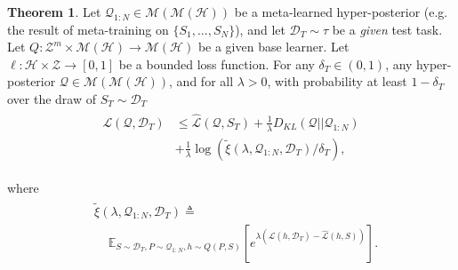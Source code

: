 \documentclass{article} %
\theoremstyle{definition}
\newtheorem{theorem}{Theorem}[section]
\newcommand{\Expect}[2]{\mathbb{E}_{#1}\left [#2 \right ]}
\begin{document}
\begin{theorem} 
	Let $\mathcal{Q}_{1:N}\in \mathcal{M}(\mathcal{M}(\mathcal{H}))$ be a meta-learned hyper-posterior (e.g. the result of meta-training on $\{S_1,...,S_N\}$), and let $\mathcal{D}_T\sim \tau$ be a \emph{given} test task. Let $Q: \mathcal{Z}^m\times\mathcal{M}(\mathcal{H})\rightarrow \mathcal{M}(\mathcal{H})$ be a given base learner. Let $\ell: \mathcal{H}\times \mathcal{Z}\rightarrow [0, 1]$ be a bounded loss function.
	For any $\delta_T \in (0,1)$, any hyper-posterior $\mathcal{Q}\in \mathcal{M}(\mathcal{M}(\mathcal{H}))$, and for all $\lambda>0$, with probability at least $1-\delta_T$ over the draw of $S_T\sim \mathcal{D}_T$
%	
	\begin{align}
	\begin{split}
	\mathcal{L}(\mathcal{Q}, \mathcal{D}_T) &\leq \hat{\mathcal{L}}(\mathcal{Q}, S_T) + \frac{1}{\lambda}D_{KL}(\mathcal{Q}||\mathcal{Q}_{1:N})\\
	&+\frac{1}{\lambda}\log\left (\tilde{\xi}(\lambda,\mathcal{Q}_{1:N},\mathcal{D}_T)/\delta_T\right ) ,
	\end{split}
	\end{align}
	
	where 
	\begin{align} \label{eq:tilde_xi}
	\begin{split}
	&\tilde{\xi}(\lambda,\mathcal{Q}_{1:N},\mathcal{D}_T)\triangleq \\
	&\;\;\;\; \Expect{S\sim \mathcal{D}_T, P\sim \mathcal{Q}_{1:N}, h\sim Q(P,S)}{e^{\lambda\left (\mathcal{L}(h, \mathcal{D}_T)-\hat{\mathcal{L}}(h, S)\right )}} .
	\end{split}
	\end{align}
\end{theorem}
\end{document}
